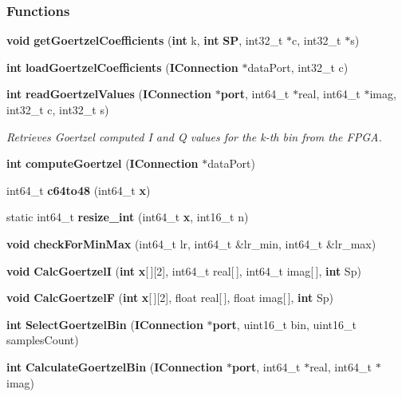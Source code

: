 \subsubsection*{Functions}
\begin{DoxyCompactItemize}
\item 
{\bf void} {\bf get\+Goertzel\+Coefficients} ({\bf int} k, {\bf int} {\bf SP}, int32\+\_\+t $\ast$c, int32\+\_\+t $\ast$s)
\item 
{\bf int} {\bf load\+Goertzel\+Coefficients} ({\bf I\+Connection} $\ast$data\+Port, int32\+\_\+t c)
\item 
{\bf int} {\bf read\+Goertzel\+Values} ({\bf I\+Connection} $\ast${\bf port}, int64\+\_\+t $\ast$real, int64\+\_\+t $\ast$imag, int32\+\_\+t c, int32\+\_\+t s)
\begin{DoxyCompactList}\small\item\em Retrieves Goertzel computed I and Q values for the k-\/th bin from the F\+P\+GA. \end{DoxyCompactList}\item 
{\bf int} {\bf compute\+Goertzel} ({\bf I\+Connection} $\ast$data\+Port)
\item 
int64\+\_\+t {\bf c64to48} (int64\+\_\+t {\bf x})
\item 
static int64\+\_\+t {\bf resize\+\_\+int} (int64\+\_\+t {\bf x}, int16\+\_\+t n)
\item 
{\bf void} {\bf check\+For\+Min\+Max} (int64\+\_\+t lr, int64\+\_\+t \&lr\+\_\+min, int64\+\_\+t \&lr\+\_\+max)
\item 
{\bf void} {\bf Calc\+GoertzelI} ({\bf int} {\bf x}[$\,$][2], int64\+\_\+t real[$\,$], int64\+\_\+t imag[$\,$], {\bf int} Sp)
\item 
{\bf void} {\bf Calc\+GoertzelF} ({\bf int} {\bf x}[$\,$][2], float real[$\,$], float imag[$\,$], {\bf int} Sp)
\item 
{\bf int} {\bf Select\+Goertzel\+Bin} ({\bf I\+Connection} $\ast${\bf port}, uint16\+\_\+t bin, uint16\+\_\+t samples\+Count)
\item 
{\bf int} {\bf Calculate\+Goertzel\+Bin} ({\bf I\+Connection} $\ast${\bf port}, int64\+\_\+t $\ast$real, int64\+\_\+t $\ast$imag)
\end{DoxyCompactItemize}
